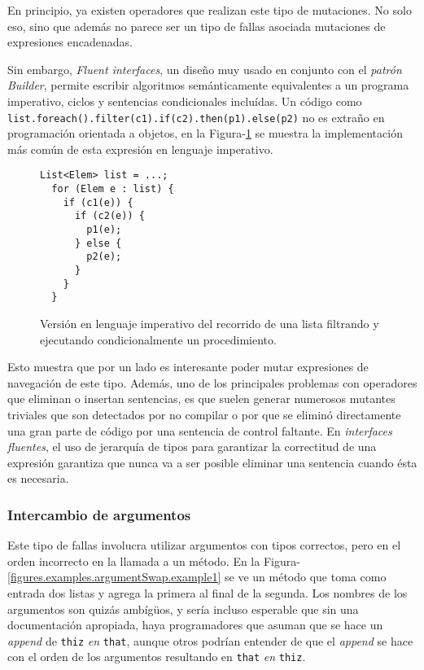 En principio, ya existen operadores que realizan este tipo de mutaciones. No solo eso, sino que adem\'as no parece ser un tipo de fallas asociada mutaciones de expresiones encadenadas.

Sin embargo, \emph{Fluent interfaces}, un dise\~no muy usado en conjunto con el \emph{patr\'on Builder}, permite escribir algoritmos sem\'anticamente equivalentes a un programa imperativo, ciclos y sentencias condicionales inclu\'idas. Un c\'odigo como \lstinline|list.foreach().filter(c1).if(c2).then(p1).else(p2)| no es extra\~no en programaci\'on orientada a objetos, en la Figura-\ref{figures.examples.fluent.example1.imperative} se muestra la implementaci\'on m\'as com\'un de esta expresi\'on en lenguaje imperativo.

\begin{figure}
	\begin{lstlisting}[frame=single, mathescape=true,framexleftmargin=1.5em]
  List<Elem> list = ...;
  for (Elem e : list) {
    if (c1(e)) {
      if (c2(e)) {
        p1(e);
      } else {
        p2(e);
      }
    }
  }
	\end{lstlisting}
	\caption{Versi\'on en lenguaje imperativo del recorrido de una lista filtrando y ejecutando condicionalmente un procedimiento.}
	\label{figures.examples.fluent.example1.imperative}
\end{figure}

Esto muestra que por un lado es interesante poder mutar expresiones de navegaci\'on de este tipo. Adem\'as, uno de los principales problemas con operadores que eliminan o insertan sentencias, es que suelen generar numerosos mutantes triviales que son detectados por no compilar o por que se elimin\'o directamente una gran parte de c\'odigo por una sentencia de control faltante. En \emph{interfaces fluentes}, el uso de jerarqu\'ia de tipos para garantizar la correctitud de una expresi\'on garantiza que nunca va a ser posible eliminar una sentencia cuando \'esta es necesaria.

\subsubsection{Intercambio de argumentos}

Este tipo de fallas involucra utilizar argumentos con tipos correctos, pero en el orden incorrecto en la llamada a un m\'etodo. En la Figura-\ref{figures.examples.argumentSwap.example1} se ve un m\'etodo que toma como entrada dos listas y agrega la primera al final de la segunda. Los nombres de los argumentos son quiz\'as amb\'ig\"{u}os, y ser\'ia incluso esperable que sin una documentaci\'on apropiada, haya programadores que asuman que se hace un \emph{append} de \texttt{thiz} \emph{en} \texttt{that}, aunque otros podr\'ian entender de que el \emph{append} se hace con el orden de los argumentos resultando en \texttt{that} \emph{en} \texttt{thiz}. 

